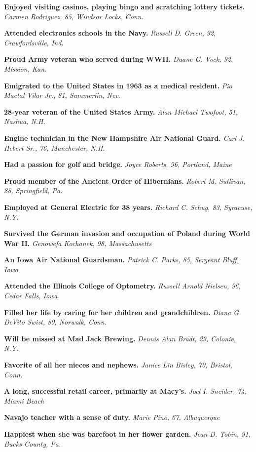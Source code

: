 \textbf{Enjoyed visiting casinos, playing bingo and scratching lottery
tickets.} \emph{Carmen Rodriguez, 85, Windsor Locks, Conn.}

\textbf{Attended electronics schools in the Navy.} \emph{Russell D.
Green, 92, Crawfordsville, Ind.}

\textbf{Proud Army veteran who served during WWII.} \emph{Duane G. Vock,
92, Mission, Kan.}

\textbf{Emigrated to the United States in 1963 as a medical resident.}
\emph{Pio Mactal Vilar Jr., 81, Summerlin, Nev.}

\textbf{28-year veteran of the United States Army.} \emph{Alan Michael
Twofoot, 51, Nashua, N.H.}

\textbf{Engine technician in the New Hampshire Air National Guard.}
\emph{Carl J. Hebert Sr., 76, Manchester, N.H.}

\textbf{Had a passion for golf and bridge.} \emph{Joyce Roberts, 96,
Portland, Maine}

\textbf{Proud member of the Ancient Order of Hibernians.} \emph{Robert
M. Sullivan, 88, Springfield, Pa.}

\textbf{Employed at General Electric for 38 years.} \emph{Richard C.
Schug, 83, Syracuse, N.Y.}

\textbf{Survived the German invasion and occupation of Poland during
World War II.} \emph{Genowefa Kochanek, 98, Massachusetts}

\textbf{An Iowa Air National Guardsman.} \emph{Patrick C. Parks, 85,
Sergeant Bluff, Iowa}

\textbf{Attended the Illinois College of Optometry.} \emph{Russell
Arnold Nielsen, 96, Cedar Falls, Iowa}

\textbf{Filled her life by caring for her children and grandchildren.}
\emph{Diana G. DeVito Swist, 80, Norwalk, Conn.}

\textbf{Will be missed at Mad Jack Brewing.} \emph{Dennis Alan Bradt,
29, Colonie, N.Y.}

\textbf{Favorite of all her nieces and nephews.} \emph{Janice Lin
Bisley, 70, Bristol, Conn.}

\textbf{A long, successful retail career, primarily at Macy's.}
\emph{Joel I. Sneider, 74, Miami Beach}

\textbf{Navajo teacher with a sense of duty.} \emph{Marie Pino, 67,
Albuquerque}

\textbf{Happiest when she was barefoot in her flower garden.} \emph{Jean
D. Tobin, 91, Bucks County, Pa.}

